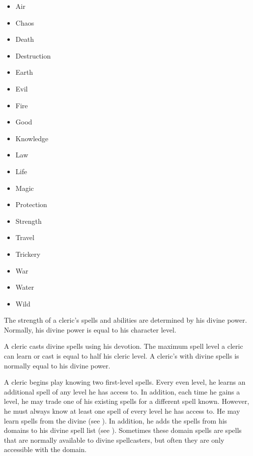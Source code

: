         \begin{itemize}
            \item{Air}
            \item{Chaos}
            \item{Death}
            \item{Destruction}
            \item{Earth}
            \item{Evil}
            \item{Fire}
            \item{Good}
            \item{Knowledge}
            \item{Law}
            \item{Life}
            \item{Magic}
            \item{Protection}
            \item{Strength}
            \item{Travel}
            \item{Trickery}
            \item{War}
            \item{Water}
            \item{Wild}
        \end{itemize}

        The strength of a cleric's spells and abilities are determined by his divine power.
        Normally, his divine power is equal to his character level.

        A cleric casts divine spells using his devotion.
        The maximum spell level a cleric can learn or cast is equal to half his cleric level.
        A cleric's  with divine spells is normally equal to his divine power.

        A cleric begins play knowing two first-level spells.
        Every even level, he learns an additional spell of any level he has access to.
        In addition, each time he gains a level, he may trade one of his existing spells for a different spell known.
        However, he must always know at least one spell of every level he has access to.
        He may learn spells from the divine  (see ).
        In addition, he adds the spells from his domains to his divine spell list (see ).
        Sometimes these domain spells are spells that are normally available to divine spellcasters, but often they are only accessible with the domain.

